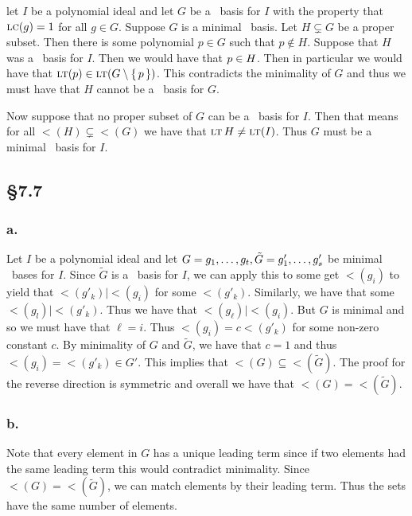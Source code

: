 \documentclass[letterpaper]{article}
\begin{document}
let $I$ be a polynomial ideal and let $G$ be a \Grobner\ basis for $I$ with the property that $\operatorname{\textsc{lc}}(g) = 1$ for all $g \in G$. Suppose $G$ is a minimal \Grobner\ basis. Let $H \subsetneq G$ be a proper subset. Then there is some polynomial $p \in G$ such that $p \notin H$. Suppose that $H$ was a \Grobner\ basis for $I$. Then we would have that $p \in \gen{H}$. Then in particular we would have that $\lt(p) \in \gen{\lt(G \setminus \set{p})}$. This contradicts the minimality of $G$ and thus we must have that $H$ cannot be a \Grobner\ basis for $G$.

Now suppose that no proper subset of $G$ can be a \Grobner\ basis for $I$. Then that means for all $\lt(H) \subsetneq \lt(G)$ we have that $\gen{\lt{H}} \neq \gen{\lt(I)}$. Thus $G$ must be a minimal \Grobner\ basis for $I$.

\subsection{\S 7.7}

\subsubsection{a.}

Let $I$ be a polynomial ideal and let $G = \gen{g_{1}, \ldots, g_{t}}, \tilde{G} = \gen{g'_{1}, \ldots, g'_{s}}$ be minimal \Grobner\ bases for $I$. Since $\tilde{G}$ is a \Grobner\ basis for $I$, we can apply this to some get $\lt(g_{i})$ to yield that $\lt(g'_{k}) \mid \lt(g_{i})$ for some $\lt(g'_{k})$. Similarly, we have that some $\lt(g_{l}) \mid \lt(g'_{k})$. Thus we have that $\lt(g_{\ell}) \mid \lt(g_{i})$. But $G$ is minimal and so we must have that $\ell = i$. Thus $\lt(g_{i}) = c \lt(g'_{k})$ for some non-zero constant $c$. By minimality of $G$ and $\tilde{G}$, we have that $c = 1$ and thus $\lt(g_{i}) = \lt(g'_{k}) \in G'$. This implies that $\lt(G) \subseteq \lt(\tilde{G})$. The proof for the reverse direction is symmetric and overall we have that $\lt(G) = \lt(\tilde{G})$.

\subsubsection{b.}

Note that every element in $G$ has a unique leading term since if two elements had the same leading term this would contradict minimality. Since $\lt(G) = \lt(\tilde{G})$, we can match elements by their leading term. Thus the sets have the same number of elements.
\end{document}
